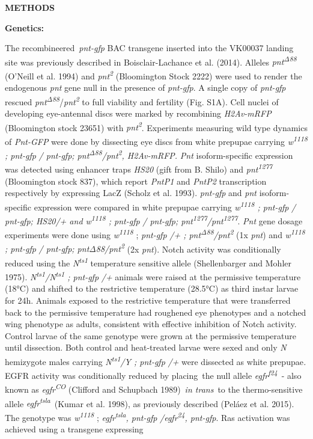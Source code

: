 \protect\hypertarget{_gjdgxs}{}{}\textbf{METHODS}

\textbf{Genetics:}

The recombineered~\emph{pnt-gfp} BAC transgene inserted into the VK00037 landing site was previously described in Boisclair-Lachance et al. (2014). Alleles \emph{pnt\textsuperscript{Δ88}} (O'Neill et al. 1994) and \emph{pnt\textsuperscript{2}} (Bloomington Stock 2222) were used to render the endogenous \emph{pnt} gene null in the presence of \emph{pnt-gfp}. A single copy of \emph{pnt-gfp} rescued \emph{pnt\textsuperscript{Δ88}}/\emph{pnt\textsuperscript{2}} to full viability and fertility (Fig. S1A). Cell nuclei of developing eye-antennal discs were marked by recombining \emph{H2Av-mRFP} (Bloomington stock 23651) with \emph{pnt\textsuperscript{2}}. Experiments measuring wild type dynamics of \emph{Pnt-GFP} were done by dissecting eye discs from white prepupae carrying \emph{w\textsuperscript{1118} ; pnt-gfp} \emph{/ pnt-gfp; pnt\textsuperscript{Δ88}/pnt\textsuperscript{2}, H2Av-mRFP.} \emph{Pnt} isoform-specific expression was detected using enhancer traps \emph{HS20} (gift from B. Shilo) and \emph{pnt\textsuperscript{1277}} (Bloomington stock 837), which report \emph{PntP1} and \emph{PntP2} transcription respectively by expressing LacZ (Scholz et al. 1993). \emph{pnt-gfp} and \emph{pnt} isoform-specific expression were compared in white prepupae carrying \emph{w\textsuperscript{1118} ; pnt-gfp} \emph{/ pnt-gfp; HS20/+ and w\textsuperscript{1118} ; pnt-gfp} \emph{/ pnt-gfp; pnt\textsuperscript{1277}/pnt\textsuperscript{1277}}. \emph{Pnt} gene dosage experiments were done using \emph{w\textsuperscript{1118 }}; \emph{pnt-gfp} \emph{/+ ; pnt\textsuperscript{Δ88}/pnt\textsuperscript{2}} (1x \emph{pnt}) and \emph{w\textsuperscript{1118} ; pnt-gfp} \emph{/ pnt-gfp; pntΔ88/pnt\textsuperscript{2}} (2x \emph{pnt}). Notch activity was conditionally reduced using the \emph{N\textsuperscript{ts1}} temperature sensitive allele (Shellenbarger and Mohler 1975). \emph{N\textsuperscript{ts1}/N\textsuperscript{ts1} ; pnt-gfp} \emph{/+} animals were raised at the permissive temperature (18°C) and shifted to the restrictive temperature (28.5°C) as third instar larvae for 24h. Animals exposed to the restrictive temperature that were transferred back to the permissive temperature had roughened eye phenotypes and a notched wing phenotype as adults, consistent with effective inhibition of Notch activity. Control larvae of the same genotype were grown at the permissive temperature until dissection. Both control and heat-treated larvae were sexed and only \emph{N} hemizygote males carrying \emph{N\textsuperscript{ts1}/Y ; pnt-gfp} \emph{/+} were dissected as white prepupae\emph{.} EGFR activity was conditionally reduced by placing~the null allele \emph{egfr\textsuperscript{f24}}~- also known as \emph{egfr\textsuperscript{CO}} (Clifford and Schupbach 1989)~\emph{in trans}~to the thermo-sensitive allele \emph{egfr\textsuperscript{tsla}}~(Kumar et al. 1998), as previously described (Peláez et al. 2015). The genotype was \emph{w\textsuperscript{1118 }}; \emph{egfr\textsuperscript{tsla}, pnt-gfp} \emph{/egfr\textsuperscript{24}, pnt-gfp}. Ras activation was achieved using a transgene expressing 
